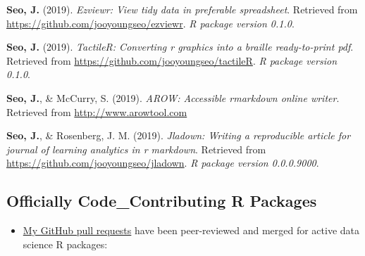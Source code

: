 \documentclass[11pt, a4paper]{awesome-cv}
\providecommand{\tightlist}{%
	\setlength{\itemsep}{0pt}\setlength{\parskip}{0pt}}
\begin{document}
\leavevmode\hypertarget{ref-R-ezviewr}{}%
\textbf{Seo, J.} (2019). \emph{Ezviewr: View tidy data in preferable
spreadsheet}. Retrieved from
\url{https://github.com/jooyoungseo/ezviewr}. \emph{R package version
0.1.0}.

\leavevmode\hypertarget{ref-R-tactileR}{}%
\textbf{Seo, J.} (2019). \emph{TactileR: Converting r graphics into a
braille ready-to-print pdf}. Retrieved from
\url{https://github.com/jooyoungseo/tactileR}. \emph{R package version
0.1.0}.

\leavevmode\hypertarget{ref-webrender}{}%
\textbf{Seo, J.}, \& McCurry, S. (2019). \emph{AROW: Accessible
rmarkdown online writer}. Retrieved from \url{http://www.arowtool.com}

\leavevmode\hypertarget{ref-R-jladown}{}%
\textbf{Seo, J.}, \& Rosenberg, J. M. (2019). \emph{Jladown: Writing a
reproducible article for journal of learning analytics in r markdown}.
Retrieved from \url{https://github.com/jooyoungseo/jladown}. \emph{R
package version 0.0.0.9000}.

\hypertarget{officially-code_contributing-r-packages}{%
\subsection{Officially Code\_Contributing R
Packages}\label{officially-code_contributing-r-packages}}

\begin{itemize}
\tightlist
\item
  \href{https://github.com/pulls?q=is\%3Apr+author\%3Ajooyoungseo+archived\%3Afalse+is\%3Aclosed}{My
  GitHub pull requests} have been peer-reviewed and merged for active
  data science R packages:
\end{itemize}
\end{document}
